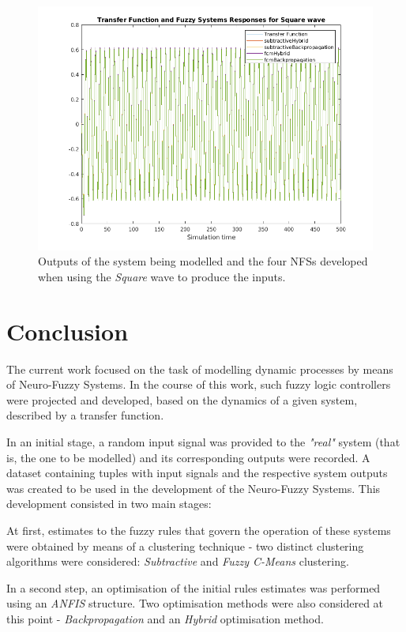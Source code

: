 \documentclass[11pt]{article}
\begin{document}
\begin{figure}[H]
	\centering
	\includegraphics[scale=0.5]{images/assessment_square.png}
	\caption{Outputs of the system being modelled and the four NFSs developed when using the \emph{Square} wave to produce the inputs.}
	\label{results_square}
\end{figure}

\section{Conclusion}
\label{conclusion}

The current work focused on the task of modelling dynamic processes by means of Neuro-Fuzzy Systems. In the course of this work, such fuzzy logic controllers were projected and developed, based on the dynamics of a given system, described by a transfer function.

In an initial stage, a random input signal was provided to the \emph{"real"} system (that is, the one to be modelled) and its corresponding outputs were recorded. A dataset containing tuples with input signals and the respective system outputs was created to be used in the development of the Neuro-Fuzzy Systems. This development consisted in two main stages:

At first, estimates to the fuzzy rules that govern the operation of these systems were obtained by means of a clustering technique - two distinct clustering algorithms were considered: \emph{Subtractive} and \emph{Fuzzy C-Means} clustering.

In a second step, an optimisation of the initial rules estimates was performed using an \emph{ANFIS} structure. Two optimisation methods were also considered at this point - \emph{Backpropagation} and an \emph{Hybrid} optimisation method.
\end{document}
